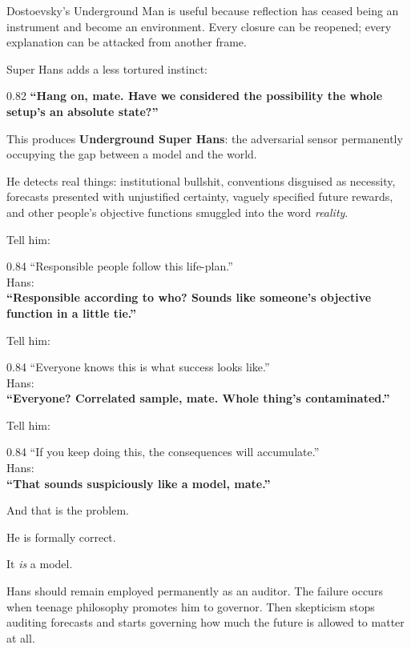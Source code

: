 \documentclass[10pt,letterpaper]{article}
\newenvironment{paperbody}
  {\begingroup\justifying}
  {\par\endgroup}
\newenvironment{voicebox}
  {\Needspace{3.5\baselineskip}\par\vspace{0.22em}\begin{center}\begingroup
   \begin{lrbox}{\voiceboxsave}\begin{varwidth}{0.82\linewidth}
   \small\rmfamily\upshape\RaggedRight}
  {\end{varwidth}\end{lrbox}\fbox{\usebox{\voiceboxsave}}
   \endgroup\end{center}\vspace{0.22em}}
\newenvironment{dialoguebox}
  {\Needspace{5\baselineskip}\par\vspace{0.26em}\begin{center}\begingroup
   \begin{lrbox}{\dialogueboxsave}\begin{varwidth}{0.84\linewidth}
   \small\rmfamily\upshape\RaggedRight}
  {\end{varwidth}\end{lrbox}\fbox{\usebox{\dialogueboxsave}}
   \endgroup\end{center}\vspace{0.26em}}
\begin{document}
\begin{paperbody}
Dostoevsky's Underground Man is useful because reflection has ceased
being an instrument and become an environment. Every closure can be
reopened; every explanation can be attacked from another frame.

Super Hans adds a less tortured instinct:

\begin{voicebox}
\textbf{``Hang on, mate. Have we considered the possibility the whole
setup's an absolute state?''}
\end{voicebox}

This produces \textbf{Underground Super Hans}: the adversarial sensor
permanently occupying the gap between a model and the world.

He detects real things: institutional bullshit, conventions disguised as
necessity, forecasts presented with unjustified certainty, vaguely
specified future rewards, and other people's objective functions
smuggled into the word \emph{reality}.

Tell him:

\begin{dialoguebox}
``Responsible people follow this life-plan.''\\[0.35em]
Hans:\\
\textbf{``Responsible according to who? Sounds like someone's objective
function in a little tie.''}
\end{dialoguebox}

Tell him:

\begin{dialoguebox}
``Everyone knows this is what success looks like.''\\[0.35em]
Hans:\\
\textbf{``Everyone? Correlated sample, mate. Whole thing's
contaminated.''}
\end{dialoguebox}

Tell him:

\begin{dialoguebox}
``If you keep doing this, the consequences will accumulate.''\\[0.35em]
Hans:\\
\textbf{``That sounds suspiciously like a model, mate.''}
\end{dialoguebox}

And that is the problem.

He is formally correct.

It \emph{is} a model.

Hans should remain employed permanently as an auditor. The failure
occurs when teenage philosophy promotes him to governor. Then skepticism
stops auditing forecasts and starts governing how much the future is
allowed to matter at all.


\end{paperbody}
\end{document}
